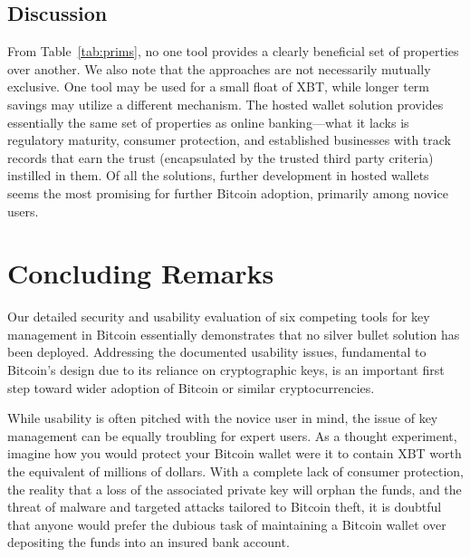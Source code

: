 \subsection{Discussion}
From Table~\ref{tab:prims}, no one tool provides a clearly beneficial set of properties over another. We also note that the approaches are not necessarily mutually exclusive. One tool may be used for a small float of XBT, while longer term savings may utilize a different mechanism. The hosted wallet solution provides essentially the same set of properties as online banking---what it lacks is regulatory maturity, consumer protection, and established businesses with track records that earn the trust (encapsulated by the trusted third party criteria) instilled in them. Of all the solutions, further development in hosted wallets seems the most promising for further Bitcoin adoption, primarily among novice users. 


\section{Concluding Remarks}
Our detailed security and usability evaluation of six competing tools for key management in Bitcoin essentially demonstrates that no silver bullet solution has been deployed. Addressing the documented usability issues, fundamental to Bitcoin's design due to its reliance on cryptographic keys, is an important first step toward wider adoption of Bitcoin or similar cryptocurrencies. 

While usability is often pitched with the novice user in mind, the issue of key management can be equally troubling for expert users. As a thought experiment, imagine how you would protect your Bitcoin wallet were it to contain XBT worth the equivalent of millions of dollars. With a complete lack of consumer protection, the reality that a loss of the associated private key will orphan the funds, and the threat of malware and targeted attacks tailored to Bitcoin theft, it is doubtful that anyone would prefer the dubious task of maintaining a Bitcoin wallet over depositing the funds into an insured bank account. 

